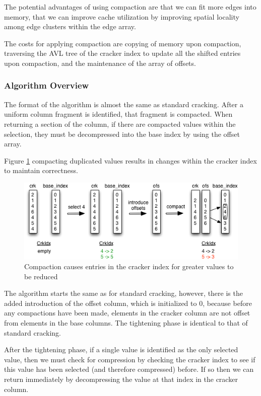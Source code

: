The potential advantages of using compaction are that we can fit more edges into memory, that we can improve cache utilization by improving spatial locality among edge clusters within the edge array.

The costs for applying compaction are copying of memory upon compaction, traversing the AVL tree of the cracker index to update all the shifted entries upon compaction, and the maintenance of the  array of offsets.

\subsubsection{Algorithm Overview}

The format of the algorithm is almost the same as standard cracking. After a uniform column fragment is identified, that fragment is compacted. When returning a section of the column, if there are compacted values within the selection, they must be decompressed into the base index by using the offset array.

Figure \ref{fig:compaction_cracker_index_usage} compacting duplicated values results in changes within the cracker index to maintain correctness.

\begin{figure}[H]
  \centering
  \includegraphics[width=\textwidth]{images/d5_compaction_cracker_index_usage}
  \caption{Compaction causes entries in the cracker index for greater values to be reduced}
  \label{fig:compaction_cracker_index_usage}
\end{figure}

The algorithm starts the same as for standard cracking, however, there is the added introduction of the offset column, which is initialized to 0, because before any compactions have been made, elements in the cracker column are not offset from elements in the base columns. The tightening phase is identical to that of standard cracking.

After the tightening phase, if a single value is identified as the only selected value, then we must check for compression by checking the cracker index to see if this value has been selected (and therefore compressed) before. If so then we can return immediately by decompressing the value at that index in the cracker column.

